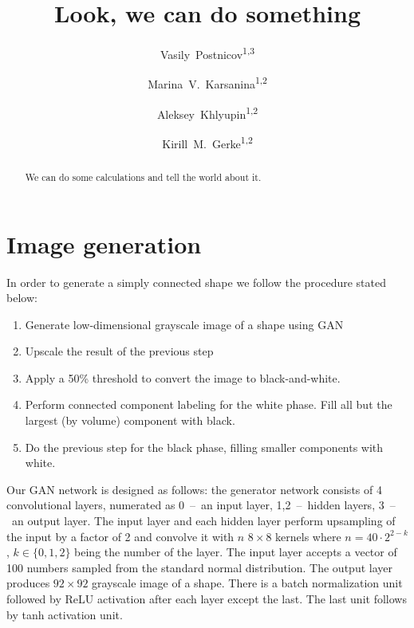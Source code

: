 \documentclass[reprint,amsmath,amssymb,aps,pre,showkeys,showpacs]{revtex4-1}
\begin{document}

\author{Vasily~Postnicov\textsuperscript{1,3}}
\author{Marina~V.~Karsanina\textsuperscript{1,2}}
\author{Aleksey~Khlyupin\textsuperscript{1,2}}
\author{Kirill~M.~Gerke\textsuperscript{1,2}}


\title{Look, we can do something}

\begin{abstract}
We can do some calculations and tell the world about it.
\end{abstract}


\maketitle

\section{Image generation}
In order to generate a simply connected shape we follow the procedure stated
below:
\begin{enumerate}
\item Generate low-dimensional grayscale image of a shape using GAN
\item Upscale the result of the previous step
\item Apply a 50\% threshold to convert the image to black-and-white.
\item Perform connected component labeling for the white phase. Fill all but
  the largest (by volume) component with black.
\item Do the previous step for the black phase, filling smaller components with
  white.
\end{enumerate}

Our GAN network is designed as follows: the generator network consists of 4
convolutional layers, numerated as 0~--~an input layer, 1,2~--~hidden layers,
3~--~an output layer. The input layer and each hidden layer perform upsampling
of the input by a factor of 2 and convolve it with $n$ $8 \times 8$ kernels
where $n = 40 \cdot 2^{2-k}$, $k \in \{0, 1, 2\}$ being the number of the
layer. The input layer accepts a vector of 100 numbers sampled from the standard
normal distribution. The output layer produces $92 \times 92$ grayscale image of
a shape. There is a batch normalization unit followed by ReLU activation after
each layer except the last. The last unit follows by tanh activation unit.
\end{document}
